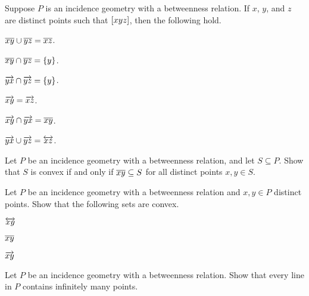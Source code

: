 \Exercises%

\begin{exercise}
Suppose \(P\) is an incidence geometry with a betweenness relation.
If \(x\), \(y\), and \(z\) are distinct points such that \([ x y z ]\), then the following hold.
\begin{proplist}
\item \(\overline{xy} \cup \overline{yz} = \overline{xz}\).
\item \(\overline{xy} \cap \overline{yz} = \{y\}\).
\item \(\overrightarrow{yx} \cap \overrightarrow{yz} = \{y\}\).
\item \(\overrightarrow{xy} = \overrightarrow{xz}\).
\item \(\overrightarrow{xy} \cap \overrightarrow{yx} = \overline{xy}\).
\item \(\overrightarrow{yx} \cup \overrightarrow{yz} = \overleftrightarrow{xz}\).
\end{proplist}
\end{exercise}

\begin{exercise}
Let \(P\) be an incidence geometry with a betweenness relation, and let \(S \subseteq P\).
Show that \(S\) is convex if and only if \(\overline{xy} \subseteq S\) for all distinct points \(x,y \in S\).
\end{exercise}

\begin{exercise}
Let \(P\) be an incidence geometry with a betweenness relation and \(x,y \in P\) distinct points.
Show that the following sets are convex.
\begin{proplist}
\item \(\overleftrightarrow{xy}\)
\item \(\overline{xy}\)
\item \(\overrightarrow{xy}\)
\end{proplist}
\end{exercise}

\begin{exercise}
Let \(P\) be an incidence geometry with a betweenness relation.
Show that every line in \(P\) contains infinitely many points.
\end{exercise}
